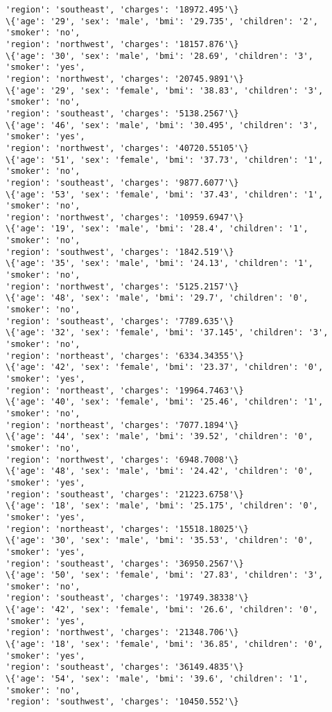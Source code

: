 \documentclass[11pt]{article}
\begin{document}
\begin{Verbatim}[commandchars=\\\{\}]
'region': 'southeast', 'charges': '18972.495'\}
\{'age': '29', 'sex': 'male', 'bmi': '29.735', 'children': '2', 'smoker': 'no',
'region': 'northwest', 'charges': '18157.876'\}
\{'age': '30', 'sex': 'male', 'bmi': '28.69', 'children': '3', 'smoker': 'yes',
'region': 'northwest', 'charges': '20745.9891'\}
\{'age': '29', 'sex': 'female', 'bmi': '38.83', 'children': '3', 'smoker': 'no',
'region': 'southeast', 'charges': '5138.2567'\}
\{'age': '46', 'sex': 'male', 'bmi': '30.495', 'children': '3', 'smoker': 'yes',
'region': 'northwest', 'charges': '40720.55105'\}
\{'age': '51', 'sex': 'female', 'bmi': '37.73', 'children': '1', 'smoker': 'no',
'region': 'southeast', 'charges': '9877.6077'\}
\{'age': '53', 'sex': 'female', 'bmi': '37.43', 'children': '1', 'smoker': 'no',
'region': 'northwest', 'charges': '10959.6947'\}
\{'age': '19', 'sex': 'male', 'bmi': '28.4', 'children': '1', 'smoker': 'no',
'region': 'southwest', 'charges': '1842.519'\}
\{'age': '35', 'sex': 'male', 'bmi': '24.13', 'children': '1', 'smoker': 'no',
'region': 'northwest', 'charges': '5125.2157'\}
\{'age': '48', 'sex': 'male', 'bmi': '29.7', 'children': '0', 'smoker': 'no',
'region': 'southeast', 'charges': '7789.635'\}
\{'age': '32', 'sex': 'female', 'bmi': '37.145', 'children': '3', 'smoker': 'no',
'region': 'northeast', 'charges': '6334.34355'\}
\{'age': '42', 'sex': 'female', 'bmi': '23.37', 'children': '0', 'smoker': 'yes',
'region': 'northeast', 'charges': '19964.7463'\}
\{'age': '40', 'sex': 'female', 'bmi': '25.46', 'children': '1', 'smoker': 'no',
'region': 'northeast', 'charges': '7077.1894'\}
\{'age': '44', 'sex': 'male', 'bmi': '39.52', 'children': '0', 'smoker': 'no',
'region': 'northwest', 'charges': '6948.7008'\}
\{'age': '48', 'sex': 'male', 'bmi': '24.42', 'children': '0', 'smoker': 'yes',
'region': 'southeast', 'charges': '21223.6758'\}
\{'age': '18', 'sex': 'male', 'bmi': '25.175', 'children': '0', 'smoker': 'yes',
'region': 'northeast', 'charges': '15518.18025'\}
\{'age': '30', 'sex': 'male', 'bmi': '35.53', 'children': '0', 'smoker': 'yes',
'region': 'southeast', 'charges': '36950.2567'\}
\{'age': '50', 'sex': 'female', 'bmi': '27.83', 'children': '3', 'smoker': 'no',
'region': 'southeast', 'charges': '19749.38338'\}
\{'age': '42', 'sex': 'female', 'bmi': '26.6', 'children': '0', 'smoker': 'yes',
'region': 'northwest', 'charges': '21348.706'\}
\{'age': '18', 'sex': 'female', 'bmi': '36.85', 'children': '0', 'smoker': 'yes',
'region': 'southeast', 'charges': '36149.4835'\}
\{'age': '54', 'sex': 'male', 'bmi': '39.6', 'children': '1', 'smoker': 'no',
'region': 'southwest', 'charges': '10450.552'\}

\end{Verbatim}
\end{document}
